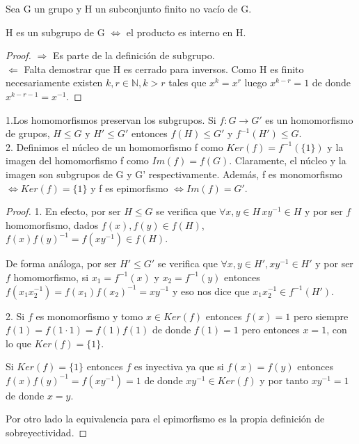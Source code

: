\begin{nprop}
Sea G un grupo y H un subconjunto finito no vacío de G. 

H es un subgrupo de G $\iff$ el producto es interno en H.
\end{nprop}

\begin{proof}
$\Rightarrow$ Es parte de la definición de subgrupo. \\
$\Leftarrow$ Falta demostrar que H es cerrado para inversos. Como H es finito necesariamente existen $k,r \in \mathbb{N}, k>r$ tales que $x^k = x^r$ luego $x^{k-r} = 1$ de donde $x^{k-r-1} = x^{-1}$. 
\end{proof}

\begin{nprop}
1.Los homomorfismos preservan los subgrupos. Si $f:G \rightarrow G'$ es un homomorfismo de grupos, $H \le G$ y $H' \le G'$ entonces $f(H) \le G'$ y $f^{-1}(H') \le G$.\\
2. Definimos el núcleo de un homomorfismo f como $Ker(f) = f^{-1}(\{1\})$ y la imagen del homomorfismo f como $Im(f) = f(G)$. Claramente, el núcleo y la imagen son subgrupos de G y G' respectivamente. Además, f es monomorfismo $\iff Ker(f) = \{1\}$ y f es epimorfismo $\iff Im(f) = G'$.
\end{nprop}
\begin{proof}
1. En efecto, por ser $H \le G$ se verifica que $\forall x,y \in H \, xy^{-1} \in H$ y por ser $f$ homomorfismo, dados $f(x),f(y) \in f(H)$, $f(x)f(y)^{-1} = f(xy^{-1}) \in f(H)$. 

De forma análoga, por ser $H' \le G'$ se verifica que $\forall x,y \in H', xy^{-1} \in H'$ y por ser $f$ homomorfismo, si $x_1 = f^{-1}(x)$ y $x_2 = f^{-1}(y)$ entonces $f(x_1x_2^{-1}) = f(x_1)f(x_2)^{-1} = xy^{-1}$ y eso nos dice que $x_1x_2^{-1} \in f^{-1}(H')$.

2. Si $f$ es monomorfismo y tomo $x \in Ker(f)$ entonces $f(x) = 1$ pero siempre $f(1) = f(1 \cdot 1) = f(1)f(1)$ de donde $f(1) = 1$ pero entonces $x = 1$, con lo que $Ker(f) = \{1\}$.

Si $Ker(f) = \{1\}$ entonces $f$ es inyectiva ya que si $f(x) = f(y)$ entonces $f(x)f(y)^{-1} = f(xy^{-1}) = 1$ de donde $xy^{-1} \in Ker(f)$ y por tanto $xy^{-1} = 1$ de donde $x = y$.

Por otro lado la equivalencia para el epimorfismo es la propia definición de sobreyectividad.
\end{proof}

